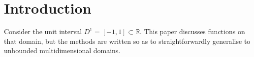 \documentclass[final,sigplan,review,anonymous]{acmart}\settopmatter{printfolios=true,printccs=false,printacmref=false}
\theoremstyle{acmplain}
\theoremstyle{acmdefinition}
\begin{document}


\maketitle


\section{Introduction}

Consider the unit interval $D^1 = [-1,1] \subset \mathbb{R}$.
This paper discusses functions on that domain, but the methods are written so as to straightforwardly generalise to unbounded multidimensional domains.
\end{document}
